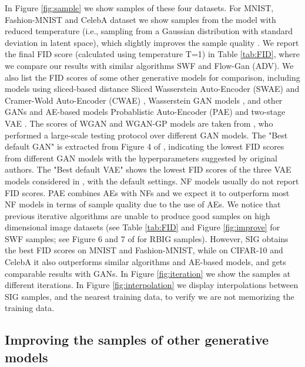 \documentclass{article}
\begin{document}
In Figure \ref{fig:sample} we show samples of these four datasets. For MNIST, Fashion-MNIST and CelebA dataset we show samples from the model with reduced temperature  (i.e., sampling from a Gaussian distribution with standard deviation  in latent space), which slightly improves the sample quality \citep{parmar2018image, kingma2018glow}. We report the final FID score (calculated using temperature T=1) in Table \ref{tab:FID}, where we compare our results with similar algorithms SWF and Flow-Gan (ADV). We also list the FID scores of some other generative models for comparison, including models using sliced-based distance Sliced Wasserstein Auto-Encoder (SWAE) \citep{kolouri2018sliced} and Cramer-Wold Auto-Encoder (CWAE) \citep{knop2018cramer}, Wasserstein GAN models \citep{arjovsky2017wasserstein, gulrajani2017improved}, and other GANs and AE-based models Probablistic Auto-Encoder (PAE) \citep{bohm2020probabilistic} and two-stage VAE \citep{dai2019diagnosing,xiao2019generative}.
The scores of WGAN and WGAN-GP models are taken from \citet{lucic2018gans}, who performed a large-scale testing protocol over different GAN models. The "Best default GAN" is extracted from Figure 4 of \citet{lucic2018gans}, indicating the lowest FID scores from different GAN models with the hyperparameters suggested by original authors. The "Best default VAE" shows the lowest FID scores of the three VAE models considered in \citet{dai2019diagnosing}, with the default settings. NF models usually do not report FID scores. PAE combines AEs with NFs and we expect it to outperform most NF models in terms of sample quality due to the use of AEs. We notice that previous iterative algorithms are unable to produce good samples on high dimensional image datasets (see Table \ref{tab:FID} and Figure \ref{fig:improve} for SWF samples; see Figure 6 and 7 of \citet{meng2020gaussianization} for RBIG samples). However, SIG obtains the best FID scores on MNIST and Fashion-MNIST, while on CIFAR-10 and CelebA it also outperforms similar algorithms and AE-based models, and gets comparable results with GANs.
In Figure \ref{fig:iteration} we show the samples at different iterations. 
In Figure \ref{fig:interpolation} we display interpolations between SIG samples, and the nearest training data, to verify we are not memorizing the training data.


\subsection{Improving the samples of other generative models}
\end{document}
